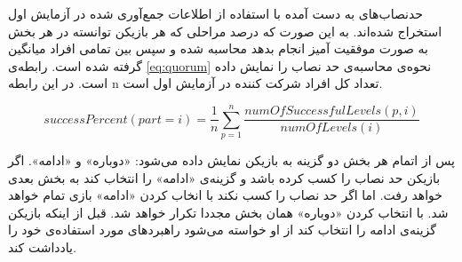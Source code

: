 \documentclass[twoside, a4paper,11pt]{book}
\numberwithin{equation}{chapter}
\numberwithin{table}{chapter}
\numberwithin{figure}{chapter}
\numberwithin{equation}{chapter}
\begin{document}
\begin{table}[]
\end{table}

حدنصاب‌های به دست آمده با استفاده از اطلاعات جمع‌آوری شده در آزمایش اول استخراج شده‌اند. به این صورت که درصد مراحلی که هر بازیکن توانسته در هر بخش به صورت موفقیت آمیز انجام بدهد محاسبه شده و سپس بین تمامی افراد میانگین گرفته شده است. رابطه‌ی \ref{eq:quorum} نحوه‌ی محاسبه‌ی حد نصاب را نمایش داده است. در این رابطه n تعداد کل افراد شرکت کننده در آزمایش اول است.

\begin{equation}
\label{eq:quorum}
	successPercent(part = i) = \frac{1}{n} \sum_{p = 1}^{n} \frac{numOfSuccessfulLevels(p, i)}{numOfLevels(i)}
\end{equation}

پس از اتمام هر بخش دو گزینه به بازیکن نمایش داده می‌شود: «دوباره» و «ادامه». اگر بازیکن حد نصاب را کسب کرده باشد و گزینه‌ی «ادامه» را انتخاب کند به بخش بعدی خواهد رفت. اما اگر حد نصاب را کسب نکند با انخاب کردن «ادامه» بازی تمام خواهد شد. با انتخاب کردن «دوباره» همان بخش مجددا تکرار خواهد شد. قبل از اینکه بازیکن گزینه‌ی ادامه را انتخاب کند از او خواسته می‌شود راهبردهای مورد استفاده‌ی خود را یادداشت کند.
\end{document}
